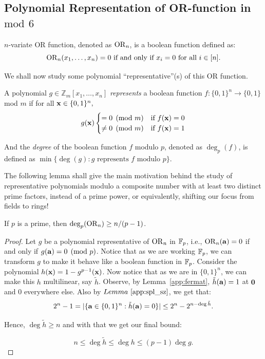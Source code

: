 \subsection{Polynomial Representation of OR-function in $\mathrm{mod }$ $6$}

\begin{definition}[OR Function]
    $n$-variate OR function, denoted as $\operatorname{OR}_n$, is a boolean function defined as:
    \[
    \operatorname{OR}_n(x_1,\ldots,x_n) = 0 \text{ if and only if } x_i = 0 \text{ for all } i\in[n].
    \]
\end{definition}

We shall now study some polynomial ``representative''(s) of this OR function. 


\begin{definition}
    A polynomial $g \in \mathbb{Z}_m[x_1, \ldots, x_n]$ \emph{represents} a boolean function $f : \{0,1\}^n \to \{0,1\}$ mod $m$ if for all $ \mathbf{x} \in \{0,1\}^n,$
\[
 g(\mathbf{x}) 
\begin{cases} 
= 0 \pmod{m} & \text{if } f(\mathbf{x}) = 0 \\ 
\neq 0 \pmod{m} & \text{if } f(\mathbf{x}) = 1 
\end{cases}
\]

And the \emph{degree} of the boolean function $f$ modulo $p$, denoted as $\deg_p(f)$, is defined as $ \min\{\deg(g) : g \text{ represents $f$ modulo $p$}\}$.
\end{definition}

The following lemma shall give the main motivation behind the study of representative polynomials modulo a composite number with at least two distinct prime factors, instead of a prime power, or equivalently, shifting our focus from fields to rings!

\begin{greybox}
    \begin{lemma}\label{why no prime}
        If $p$ is a prime, then $\deg_p(\operatorname{OR}_n)\geq n/(p-1)$. 
    \end{lemma}
\end{greybox}

\begin{proof}
    Let $g$ be a polynomial representative of $\operatorname{OR}_n$ in $\mathbb{F}_p$, i.e., $\operatorname{OR}_n(\mathbf{a}) = 0$ if and only if $g(\mathbf{a}) = 0 \pmod p$. Notice that as we are working $\mathbb{F}_p$, we can transform $g$ to make it behave like a boolean function in $\mathbb{F}_p$. Consider the polynomial $h(\mathbf{x}) = 1 - g^{p-1}(\mathbf{x})$. Now notice that as we are in $\{0,1\}^n$, we can make this $h$ multilinear, say $\tilde{h}$. Observe, by Lemma~\ref{app:fermat}, $\tilde{h}(\mathbf{a}) = 1$ at $\mathbf{0}$ and $0$ everywhere else. Also by $Lemma~\ref{app:spl_sz}$, we get that:
    \[
        2^n - 1 = |\{\mathbf{a}\in\{0,1\}^n : \tilde{h}(\mathbf{a}) = 0\}| \leq 2^n - 2^{n - \deg\tilde{h}}.
    \]

    Hence, $\deg\tilde{h}\geq n$ and with that we get our final bound:

    \[
        n\leq\deg\tilde{h}\leq\deg h\leq (p-1)\deg g.
    \]
\end{proof}

